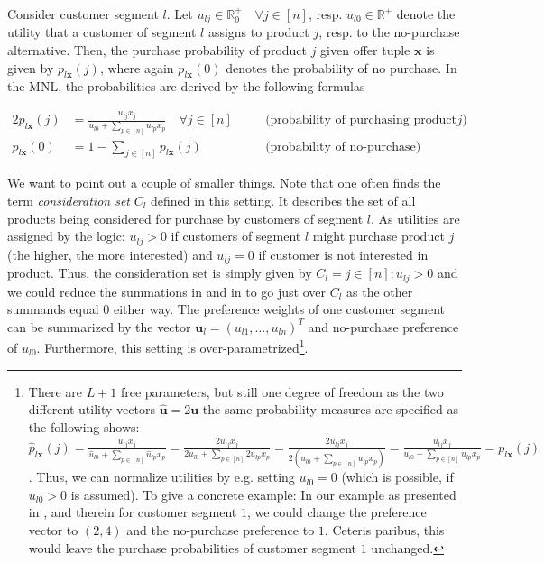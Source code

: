 Consider customer segment $l$. Let $u_{lj} \in \mathbb{R}^+_0 \quad \forall j \in [n]$, resp. $u_{l0} \in \mathbb{R}^+$ denote the utility that a customer of segment $l$ assigns to product $j$, resp. to the no-purchase alternative. Then, the purchase probability of product $j$ given offer tuple $\boldsymbol{x}$ is given by $p_{l\boldsymbol{x}}(j)$, where again $p_{l\boldsymbol{x}}(0)$ denotes the probability of no purchase. In the MNL, the probabilities are derived by the following formulas

\begin{alignat}{2}
	p_{l\boldsymbol{x}}(j) &= \frac{u_{lj}x_j}{u_{l0} + \sum_{p\in[n]} u_{lp}x_p} \quad \forall j \in [n]\quad  && \text{(probability of purchasing product $j$)}\label{eq:DCM1}\\
	p_{l\boldsymbol{x}}(0) &= 1 - \sum_{j\in[n]}p_{l\boldsymbol{x}}(j) && \text{(probability of no-purchase)}\label{eq:DCM2}
\end{alignat} 

We want to point out a couple of smaller things. Note that one often finds the term \emph{consideration set} $C_l$ defined in this setting. It describes the set of all products being considered for purchase by customers of segment $l$. As utilities are assigned by the logic:  $u_{lj} > 0$ if customers of segment $l$ might purchase product $j$ (the higher, the more interested) and $u_{lj} = 0$ if customer is not interested in product. Thus, the consideration set is simply given by $C_l = {j \in [n] : u_{lj} > 0}$ and we could reduce the summations in  and in  to go just over $C_l$ as the other summands equal $0$ either way. 
The preference weights of one customer segment can be summarized by the vector $\boldsymbol{u}_l = (u_{l1}, \dots, u_{ln})^T$ and no-purchase preference of $u_{l0}$. Furthermore, this setting is over-parametrized\footnote{There are $L+1$ free parameters, but still one degree of freedom as the two different utility vectors $\hat{\boldsymbol{u}} = 2\boldsymbol{u}$ the same probability measures are specified as the following shows: $\hat{p}_{l\boldsymbol{x}}(j) = \frac{\hat{u}_{lj}x_j}{\hat{u}_{l0} + \sum_{p\in[n]} \hat{u}_{lp}x_p} = \frac{2u_{lj}x_j}{2u_{l0} + \sum_{p\in[n]} 2u_{lp}x_p} = \frac{2u_{lj}x_j}{2\left(u_{l0} + \sum_{p\in[n]} u_{lp}x_p\right)} = \frac{u_{lj}x_j}{u_{l0} + \sum_{p\in[n]} u_{lp}x_p} =  p_{l\boldsymbol{x}}(j)$ . Thus, we can normalize utilities by e.g. setting $u_{l0} = 0$ (which is possible, if $u_{l0} > 0$ is assumed). To give a concrete example: In our example as presented in , and therein for customer segment $1$, we could change the preference vector to $(2, 4)$ and the no-purchase preference to $1$. Ceteris paribus, this would leave the purchase probabilities of customer segment $1$ unchanged.}.

